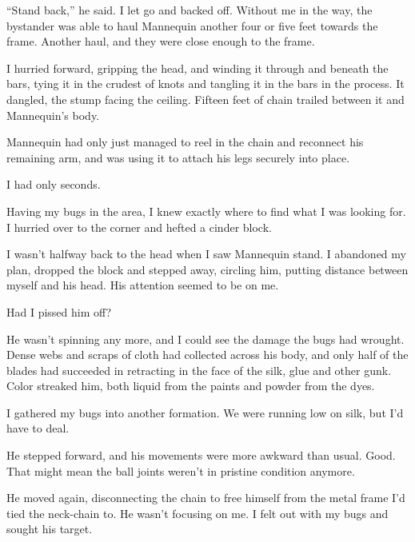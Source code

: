 ``Stand back,'' he said.  I let go and backed off.  Without me in the way, the bystander was able to haul Mannequin another four or five feet towards the frame.  Another haul, and they were close enough to the frame.



I hurried forward, gripping the head, and winding it through and beneath the bars, tying it in the crudest of knots and tangling it in the bars in the process.  It dangled, the stump facing the ceiling.  Fifteen feet of chain trailed between it and Mannequin's body.



Mannequin had only just managed to reel in the chain and reconnect his remaining arm, and was using it to attach his legs securely into place.



I had only seconds.



Having my bugs in the area, I knew exactly where to find what I was looking for.  I hurried over to the corner and hefted a cinder block.



I wasn't halfway back to the head when I saw Mannequin stand.  I abandoned my plan, dropped the block and stepped away, circling him, putting distance between myself and his head.  His attention seemed to be on me.



Had I pissed him off?



He wasn't spinning any more, and I could see the damage the bugs had wrought.  Dense webs and scraps of cloth had collected across his body, and only half of the blades had succeeded in retracting in the face of the silk, glue and other gunk.  Color streaked him, both liquid from the paints and powder from the dyes.



I gathered my bugs into another formation.  We were running low on silk, but I'd have to deal.



He stepped forward, and his movements were more awkward than usual.  Good.  That might mean the ball joints weren't in pristine condition anymore.



He moved again, disconnecting the chain to free himself from the metal frame I'd tied the neck-chain to.  He wasn't focusing on me.  I felt out with my bugs and sought his target.



